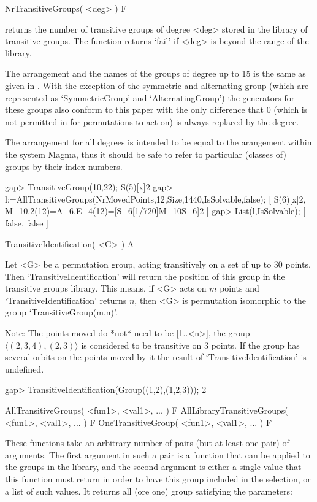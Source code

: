 \>NrTransitiveGroups( <deg> ) F

returns the number of transitive groups of degree <deg> stored in the
library of transitive groups. The function returns `fail' if <deg> is
beyond the range of the library.

The arrangement and the names of the groups of degree up to 15 is the same
as given in \cite{ConwayHulpkeMcKay98}. With the exception of the symmetric
and alternating group (which are represented as `SymmetricGroup' and
`AlternatingGroup') the generators for these groups also conform to this
paper with the only difference that 0 (which is not permitted in {\GAP} for
permutations to act on) is always replaced by the degree.

The arrangement for all degrees is intended to be equal to the arangement
within the system Magma, thus it should be safe to refer to particular
(classes of) groups by their index numbers.

\beginexample
gap> TransitiveGroup(10,22);
S(5)[x]2
gap> l:=AllTransitiveGroups(NrMovedPoints,12,Size,1440,IsSolvable,false);
[ S(6)[x]2, M_10.2(12)=A_6.E_4(12)=[S_6[1/720]{M_10}S_6]2 ]
gap> List(l,IsSolvable);
[ false, false ]
\endexample

\>TransitiveIdentification( <G> ) A

Let <G> be a permutation group, acting transitively on a set  of up to 30
points.  Then `TransitiveIdentification' will return the position of this
group in the transitive  groups library.  This means,  if <G> acts on
$m$ points and    `TransitiveIdentification'  returns $n$,  then <G>   is
permutation isomorphic to the group `TransitiveGroup(m,n)'.

Note: The points moved do *not* need to be [1..<n>], the group
$\langle (2,3,4),(2,3)\rangle$ is considered to be transitive on 3
points. If the group has several orbits on the points moved by it the
result of `TransitiveIdentification' is undefined.


\beginexample
gap> TransitiveIdentification(Group((1,2),(1,2,3)));
2
\endexample


\>AllTransitiveGroups( <fun1>, <val1>, ... ) F
\>AllLibraryTransitiveGroups( <fun1>, <val1>, ... ) F
\>OneTransitiveGroup( <fun1>, <val1>, ... ) F

These functions take an arbitrary number of pairs (but at least one pair)
of arguments. The first argument in such a pair is a function that can be
applied to the groups in the library, and the second argument is either a
single value that this function must return in order to have  this  group
included in the selection, or a list of such  values. 
It returns all (ore one) group satisfying the parameters:

